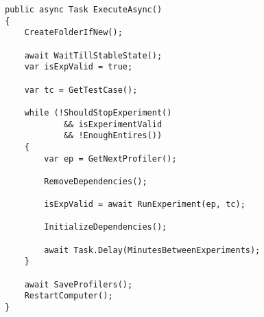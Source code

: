 
\begin{lstlisting}[caption=The method handeling dependencides and the validity of the results, label={lst:execute_async}]
public async Task ExecuteAsync()
{
    CreateFolderIfNew();

    await WaitTillStableState();
    var isExpValid = true;

    var tc = GetTestCase();

    while (!ShouldStopExperiment() 
            && isExperimentValid 
            && !EnoughEntires())
    {
        var ep = GetNextProfiler();

        RemoveDependencies();

        isExpValid = await RunExperiment(ep, tc);

        InitializeDependencies();

        await Task.Delay(MinutesBetweenExperiments);
    }

    await SaveProfilers();
    RestartComputer();
}
\end{lstlisting}